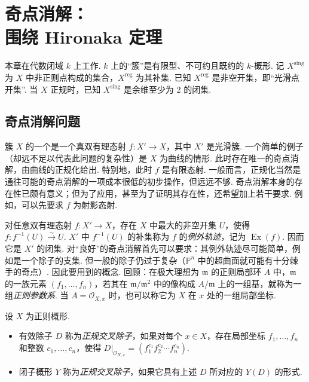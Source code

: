 \chapter[奇点消解：围绕 Hironaka 定理]{奇点消解：\protect\\围绕 Hironaka 定理}\label{chap:ag-4}
本章在代数闭域 $k$ 上工作. $k$ 上的``簇''是有限型、不可约且既约的 $k$-概形. 记 $X^{\mathrm{sing}}$ 为 $X$ 中非正则点构成的集合，$X^{\mathrm{reg}}$ 为其补集. 已知 $X^{\mathrm{reg}}$ 是非空开集，即``光滑点开集''. 当 $X$ 正规时，已知 $X^{\mathrm{sing}}$ 是余维至少为 $2$ 的闭集.
\section{奇点消解问题}\label{sec:ag-4-1}
簇 $X$ 的一个是一个真双有理态射 $f:X'\longrightarrow X$，其中 $X'$ 是光滑簇. 一个简单的例子（却远不足以代表此问题的复杂性）是 $X$ 为曲线的情形. 此时存在唯一的奇点消解，由曲线的正规化给出. 特别地，此时 $f$ 是有限态射. 一般而言，正规化当然是通往可能的奇点消解的一项成本很低的初步操作，但远远不够.
奇点消解本身的存在性已颇有意义；但为了应用，甚至为了证明其存在性，还希望加上若干要求. 例如，可以先要求 $f$ 为射影态射.
\begin{numpara}[例外轨迹的形状]\label{item:ag-4-1-1}
对任意双有理态射 $f:X'\longrightarrow X$，存在 $X$ 中最大的非空开集 $U$，使得 $f:f^{-1}(U)\xrightarrow\sim U$. $X'$ 中 $f^{-1}(U)$ 的补集称为 $f$ 的\emph{例外轨迹}，记为 $\operatorname{Ex}(f)$. 因而它是 $X'$ 的闭集.
对``良好''的奇点消解首先可以要求：其例外轨迹尽可能简单，例如是一个除子的支集. 但一般的除子仍过于复杂（$\mathbb P^n$ 中的超曲面就可能有十分棘手的奇点）. 因此要用到的概念.
回顾：在极大理想为 $\mathfrak m$ 的正则局部环 $A$ 中，$\mathfrak m$ 的一族元素 $(f_1,\ldots,f_n)$，若其在 $\mathfrak m/\mathfrak m^2$ 中的像构成 $A/\mathfrak m$ 上的一组基，就称为一组\emph{正则参数系}. 当 $A=\mathcal O_{X,x}$ 时，也可以称它为 $X$ 在 $x$ 处的一组局部坐标.
\end{numpara}
\begin{definition}\label{item:ag-4-1-2}
设 $X$ 为正则概形.
\begin{itemize}
\item 有效除子 $D$ 称为\emph{正规交叉除子}，如果对每个 $x\in X$，存在局部坐标 $f_1,\ldots,f_n$ 和整数 $c_1,\ldots,c_n$，使得 $D|_{\mathcal O_{X,x}}=(f_1^{c_1}f_2^{c_2}\cdots f_n^{c_n})$.
\item 闭子概形 $Y$ 称为\emph{正规交叉除子}，如果它具有上述 $D$ 所对应的 $Y(D)$ 的形式.
\end{itemize}
\end{definition}
